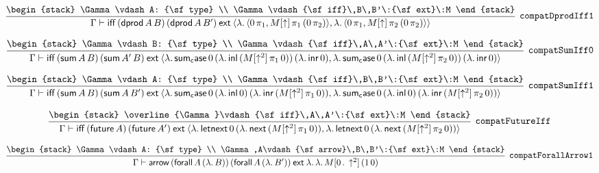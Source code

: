 \[
\infer[{\tt compatDprodIff1}]{\Gamma \vdash {\sf iff}\,({\sf dprod}\,A\,B)\,({\sf dprod}\,A\,B')\:{\sf ext}\:\langle \lambda .\,\langle 0\, \pi_1,M[\uparrow ]\, \pi_1\,(0\, \pi_2)\rangle ,\lambda .\,\langle 0\, \pi_1,M[\uparrow ]\, \pi_2\,(0\, \pi_2)\rangle \rangle }{
\begin{stack}
\Gamma \vdash A: {\sf type}
\\
\Gamma \vdash {\sf iff}\,B\,B'\:{\sf ext}\:M
\end{stack}}
\]

\[
\infer[{\tt compatSumIff0}]{\Gamma \vdash {\sf iff}\,({\sf sum}\,A\,B)\,({\sf sum}\,A'\,B)\:{\sf ext}\:\langle \lambda .\,{\sf sum_case}\,0\,(\lambda .\,{\sf inl}\,(M[\uparrow^2]\, \pi_1\,0))\,(\lambda .\,{\sf inr}\,0),\lambda .\,{\sf sum_case}\,0\,(\lambda .\,{\sf inl}\,(M[\uparrow^2]\, \pi_2\,0))\,(\lambda .\,{\sf inr}\,0)\rangle }{
\begin{stack}
\Gamma \vdash B: {\sf type}
\\
\Gamma \vdash {\sf iff}\,A\,A'\:{\sf ext}\:M
\end{stack}}
\]

\[
\infer[{\tt compatSumIff1}]{\Gamma \vdash {\sf iff}\,({\sf sum}\,A\,B)\,({\sf sum}\,A\,B')\:{\sf ext}\:\langle \lambda .\,{\sf sum_case}\,0\,(\lambda .\,{\sf inl}\,0)\,(\lambda .\,{\sf inr}\,(M[\uparrow^2]\, \pi_1\,0)),\lambda .\,{\sf sum_case}\,0\,(\lambda .\,{\sf inl}\,0)\,(\lambda .\,{\sf inr}\,(M[\uparrow^2]\, \pi_2\,0))\rangle }{
\begin{stack}
\Gamma \vdash A: {\sf type}
\\
\Gamma \vdash {\sf iff}\,B\,B'\:{\sf ext}\:M
\end{stack}}
\]

\[
\infer[{\tt compatFutureIff}]{\Gamma \vdash {\sf iff}\,({\sf future}\,A)\,({\sf future}\,A')\:{\sf ext}\:\langle \lambda .\,{\sf letnext}\,0\,(\lambda .\,{\sf next}\,(M[\uparrow^2]\, \pi_1\,0)),\lambda .\,{\sf letnext}\,0\,(\lambda .\,{\sf next}\,(M[\uparrow^2]\, \pi_2\,0))\rangle }{
\begin{stack}
\overline{\Gamma}\vdash {\sf iff}\,A\,A'\:{\sf ext}\:M
\end{stack}}
\]

\[
\infer[{\tt compatForallArrow1}]{\Gamma \vdash {\sf arrow}\,({\sf forall}\,A\,(\lambda .\,B))\,({\sf forall}\,A\,(\lambda .\,B'))\:{\sf ext}\:\lambda .\,\lambda .\,M[0\,.\,\uparrow^2]\,(1\,0)}{
\begin{stack}
\Gamma \vdash A: {\sf type}
\\
\Gamma ,A\vdash {\sf arrow}\,B\,B'\:{\sf ext}\:M
\end{stack}}
\]

